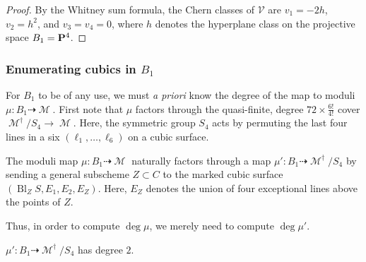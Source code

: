 \documentclass[12pt,reqno]{amsart}
\DeclareMathOperator{\Bl}{Bl}
\DeclareMathOperator{\M}{\mathcal{M}}
\renewcommand{\to}{{\longrightarrow}}
\numberwithin{equation}{section}
\newcommand{\V}{\mathcal V}
\begin{document}
\begin{proof}
  By the Whitney sum formula, the Chern classes of $\V$ are
  $v_{1} = -2h$, $v_{2}=h^2$, and $v_{3}= v_{4}=0$, where $h$ denotes
  the hyperplane class on the projective space $B_1 = \P^{4}$.
\end{proof}









\subsubsection{Enumerating cubics in $B_1$}
\label{sec:enum-cubics-b_1}




For $B_1$ to be of any use, we must {\sl a priori} know the degree of
the map to moduli $\mu: B_1 \dashrightarrow \M$.  First note that
$\mu$ factors through the quasi-finite, degree
$72 \times \frac{6!}{4!}$ cover $\M^{\dagger}/S_{4} \to \M$.  Here,
the symmetric group $S_4$ acts by permuting the last four lines in a
six $(\ell_{1}, \dots, \ell_{6})$ on a cubic surface.


The moduli map $\mu: B_{1} \dashrightarrow \M$ naturally factors
through a map $\mu': B_1 \dashrightarrow \M^{\dagger}/S_{4}$ by
sending a general subscheme $Z \subset C$ to the marked cubic surface
$(\Bl_{Z}S, E_1, E_2, E_{Z})$. Here, $E_Z$ denotes the union of four
exceptional lines above the points of $Z$.


Thus, in order to compute $\deg \mu$, we merely need to compute
$\deg \mu'$.

  \begin{lemma}
    \label{lemma:degreemudaggerB1}
    $\mu': B_1 \dashrightarrow \M^{\dagger}/S_{4}$ has degree $2$.
  \end{lemma}
\end{document}
